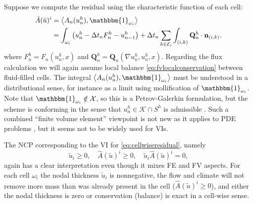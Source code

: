 \documentclass[final,onefignum]{siamart190516}
\newcommand\bn{\mathbf{n}}
\newcommand\bQ{\mathbf{Q}}
\newcommand{\grad}{\nabla}
\newcommand{\ip}[2]{\ensuremath{\left<#1,#2\right>}}
\begin{document}
Suppose we compute the residual using the characteristic function of each cell:
\begin{align}
\hat A(\tilde u)^i &= \ip{A_n(u_n^h)}{\mathbbm{1}_{\omega_i}}  \label{eq:cellwiseresidual} \\
                   &= \int_{\omega_i} \left(u_n^h - \Delta t_n F_n^h - u_{n-1}^h\right) + \Delta t_n \sum_{k\in\mathcal{E}_i} \int_{(i,k)} \bQ_n^h\cdot \bn_{(i,k)}. \notag
\end{align}
where $F_n^h = F_n(u_n^h,x)$ and $\bQ_n^h = \bQ_n(\grad u_n^h, u_n^h,x)$.  Regarding the flux calculation we will again assume local balance \eqref{eq:fvlocalconservation} between fluid-filled cells.  The integral $\ip{A_n(u_n^h)}{\mathbbm{1}_{\omega_i}}$ must be understood in a distributional sense, for instance as a limit using mollification of $\mathbbm{1}_{\omega_i}$.  Note that $\mathbbm{1}_{\omega_i} \notin \mathcal{X}$, so this is a Petrov-Galerkin formulation, but the scheme is conforming in the sense that $u_n^h\in \mathcal{K}\cap S^h$ is admissible \cite{Elmanetal2014}.  Such a combined ``finite volume element'' viewpoint is not new as it applies to PDE problems \cite[for example]{Cai1990,EwingLinLin2002}, but it seems not to be widely used for VIs.

The NCP corresponding to the VI for \eqref{eq:cellwiseresidual}, namely
\begin{equation}
\tilde u_i \ge 0, \quad \hat A(\tilde u)^i \ge 0, \quad \tilde u_i \hat A(\tilde u)^i = 0, \label{eq:FVtheNCP}
\end{equation}
again has a clear interpretation even though it mixes FE and FV aspects.  For each cell $\omega_i$ the nodal thickness $\tilde u_i$ is nonnegative, the flow and climate will not remove more mass than was already present in the cell ($\hat A(\tilde u)^i \ge 0$), and either the nodal thickness is zero or conservation (balance) is exact in a cell-wise sense.
\end{document}
